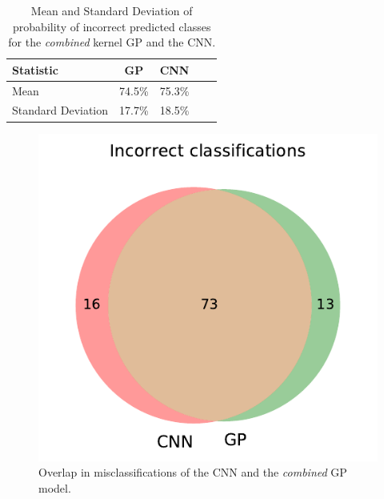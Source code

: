 \documentclass{article}
\begin{document}

\begin{table}[htb]
\caption{Mean and Standard Deviation of probability of incorrect predicted classes for the \textit{combined} kernel GP and the CNN.}
\label{tab:misprediction}
\vskip 0.15in
\begin{center}
\begin{small}
\begin{sc}
\begin{tabular}{lcccr}
\toprule
Statistic 			& GP 			& CNN \\
\midrule
Mean    			& 74.5\% 		& 75.3\% \\
Standard Deviation 	& 17.7\%		& 18.5\%  \\
\bottomrule
\end{tabular}
\end{sc}
\end{small}
\end{center}
\vskip -0.1in
\label{tab:mispredictions}
\end{table}


\begin{figure}[h]
\centering
\includegraphics[scale=0.50]{figures/mnist/venn-Linear-Matern32-Kernel-GP.pdf}
\caption{Overlap in misclassifications of the CNN and the \textit{combined} GP model.}
\label{fig:venn}
\end{figure}
\end{document}
